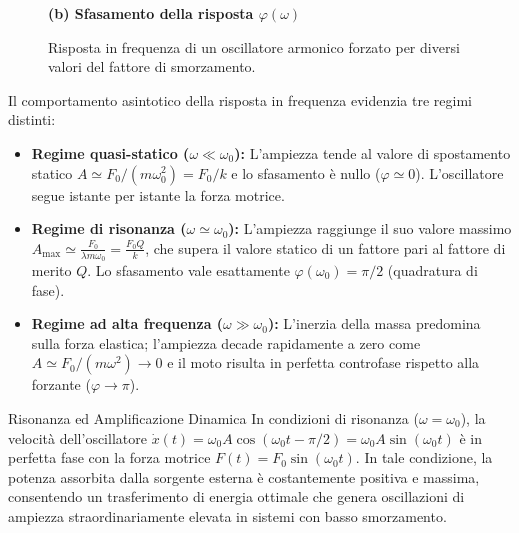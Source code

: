 \begin{figure}[ht]
\begin{minipage}[t]{0.48\textwidth}
\vspace{0.1cm}
\par\small\textbf{(b) Sfasamento della risposta $\varphi(\omega)$}
\end{minipage}
\caption{Risposta in frequenza di un oscillatore armonico forzato per diversi valori del fattore di smorzamento.}
\end{figure}

Il comportamento asintotico della risposta in frequenza evidenzia tre regimi distinti:
\begin{itemize}
    \item \textbf{Regime quasi-statico ($\omega \ll \omega_0$):} L'ampiezza tende al valore di spostamento statico $A \simeq F_0/(m\omega_0^2) = F_0/k$ e lo sfasamento è nullo ($\varphi \simeq 0$). L'oscillatore segue istante per istante la forza motrice.
    \item \textbf{Regime di risonanza ($\omega \simeq \omega_0$):} L'ampiezza raggiunge il suo valore massimo $A_{\max} \simeq \frac{F_0}{\lambda m\omega_0} = \frac{F_0 Q}{k}$, che supera il valore statico di un fattore pari al fattore di merito $Q$. Lo sfasamento vale esattamente $\varphi(\omega_0) = \pi/2$ (quadratura di fase).
    \item \textbf{Regime ad alta frequenza ($\omega \gg \omega_0$):} L'inerzia della massa predomina sulla forza elastica; l'ampiezza decade rapidamente a zero come $A \simeq F_0/(m\omega^2) \to 0$ e il moto risulta in perfetta controfase rispetto alla forzante ($\varphi \to \pi$).
\end{itemize}

\begin{osservazione}{Risonanza ed Amplificazione Dinamica}
In condizioni di risonanza ($\omega = \omega_0$), la velocità dell'oscillatore $\dot{x}(t) = \omega_0 A \cos(\omega_0 t - \pi/2) = \omega_0 A \sin(\omega_0 t)$ è in perfetta fase con la forza motrice $F(t) = F_0 \sin(\omega_0 t)$. In tale condizione, la potenza assorbita dalla sorgente esterna è costantemente positiva e massima, consentendo un trasferimento di energia ottimale che genera oscillazioni di ampiezza straordinariamente elevata in sistemi con basso smorzamento.
\end{osservazione}

